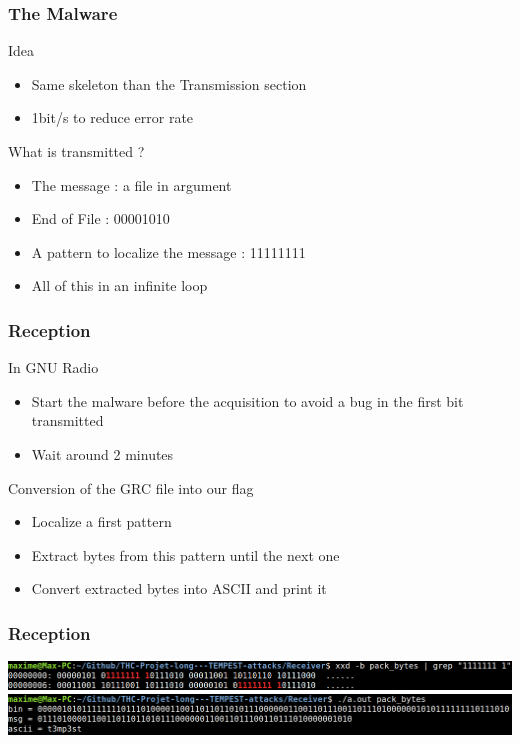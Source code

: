 \begin{frame}
\frametitle{The Malware}
\begin{block}{Idea}
\begin{itemize}
\item Same skeleton than the Transmission section
\item 1bit/s to reduce error rate
\end{itemize}
\end{block}
\begin{block}{What is transmitted ?}
\begin{itemize}
\item The message : a file in argument
\item End of File : 00001010
\item A pattern to localize the message : 11111111
\item All of this in an infinite loop
\end{itemize}
\end{block}
\end{frame}

\begin{frame}
\frametitle{Reception}
\begin{block}{In GNU Radio}
\begin{itemize}
\item Start the malware before the acquisition to avoid a bug in the first bit transmitted
\item Wait around 2 minutes
\end{itemize}
\end{block}
\begin{block}{Conversion of the GRC file into our flag}
\begin{itemize}
\item Localize a first pattern
\item Extract bytes from this pattern until the next one
\item Convert extracted bytes into ASCII and print it
\end{itemize}
\end{block}
\end{frame}

\begin{frame}
\frametitle{Reception}
\centering \includegraphics[scale=0.22]{images/xxd1.png}\\
\null
\centering \includegraphics[scale=0.22]{images/xxd2.png}
\end{frame}

